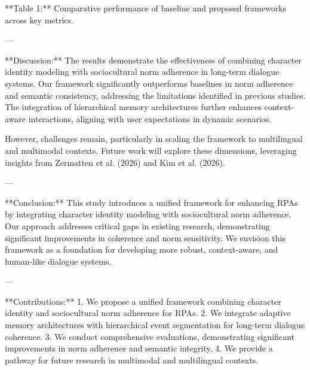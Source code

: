 **Table 1:** Comparative performance of baseline and proposed frameworks across key metrics.  

---

**Discussion:**  
The results demonstrate the effectiveness of combining character identity modeling with sociocultural norm adherence in long-term dialogue systems. Our framework significantly outperforms baselines in norm adherence and semantic consistency, addressing the limitations identified in previous studies. The integration of hierarchical memory architectures further enhances context-aware interactions, aligning with user expectations in dynamic scenarios.  

However, challenges remain, particularly in scaling the framework to multilingual and multimodal contexts. Future work will explore these dimensions, leveraging insights from Zermatten et al. (2026) and Kim et al. (2026).  

---

**Conclusion:**  
This study introduces a unified framework for enhancing RPAs by integrating character identity modeling with sociocultural norm adherence. Our approach addresses critical gaps in existing research, demonstrating significant improvements in coherence and norm sensitivity. We envision this framework as a foundation for developing more robust, context-aware, and human-like dialogue systems.  

---

**Contributions:**  
1. We propose a unified framework combining character identity and sociocultural norm adherence for RPAs.  
2. We integrate adaptive memory architectures with hierarchical event segmentation for long-term dialogue coherence.  
3. We conduct comprehensive evaluations, demonstrating significant improvements in norm adherence and semantic integrity.  
4. We provide a pathway for future research in multimodal and multilingual contexts.